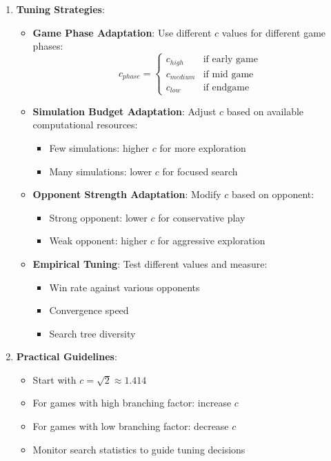 \begin{itemize}
\begin{enumerate}
        \item \textbf{Tuning Strategies}:
        \begin{itemize}
            \item \textbf{Game Phase Adaptation}: Use different $c$ values for different game phases:
            \[c_{phase} = \begin{cases}
                c_{high} & \text{if early game} \\
                c_{medium} & \text{if mid game} \\
                c_{low} & \text{if endgame}
            \end{cases}\]
            
            \item \textbf{Simulation Budget Adaptation}: Adjust $c$ based on available computational resources:
            \begin{itemize}
                \item Few simulations: higher $c$ for more exploration
                \item Many simulations: lower $c$ for focused search
            \end{itemize}
            
            \item \textbf{Opponent Strength Adaptation}: Modify $c$ based on opponent:
            \begin{itemize}
                \item Strong opponent: lower $c$ for conservative play
                \item Weak opponent: higher $c$ for aggressive exploration
            \end{itemize}
            
            \item \textbf{Empirical Tuning}: Test different values and measure:
            \begin{itemize}
                \item Win rate against various opponents
                \item Convergence speed
                \item Search tree diversity
            \end{itemize}
        \end{itemize}
        
        \item \textbf{Practical Guidelines}:
        \begin{itemize}
            \item Start with $c = \sqrt{2} \approx 1.414$
            \item For games with high branching factor: increase $c$
            \item For games with low branching factor: decrease $c$
            \item Monitor search statistics to guide tuning decisions
        \end{itemize}
    \end{enumerate}
    

\end{itemize}
